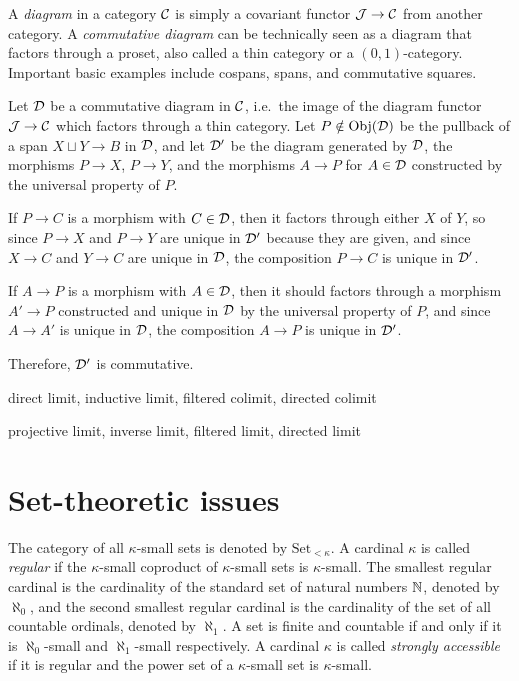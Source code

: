 \documentclass{../../large}
\begin{document}
\begin{prb}
A \emph{diagram} in a category $\mathcal{C}$ is simply a covariant functor $\mathcal{J}\to\mathcal{C}$ from another category.
A \emph{commutative diagram} can be technically seen as a diagram that factors through a proset, also called a thin category or a $(0,1)$-category.
Important basic examples include cospans, spans, and commutative squares.


Let $\mathcal{D}$ be a commutative diagram in $\mathcal{C}$, i.e.~the image of the diagram functor $\mathcal{J}\to\mathcal{C}$ which factors through a thin category.
Let $P\notin\operatorname{Obj}(\mathcal{D})$ be the pullback of a span $X\sqcup Y\to B$ in $\mathcal{D}$, and let $\mathcal{D}'$ be the diagram generated by $\mathcal{D}$, the morphisms $P\to X$, $P\to Y$, and the morphisms $A\to P$ for $A\in\mathcal{D}$ constructed by the universal property of $P$.

If $P\to C$ is a morphism with $C\in\mathcal{D}$, then it factors through either $X$ of $Y$, so since $P\to X$ and $P\to Y$ are unique in $\mathcal{D}'$ because they are given, and since $X\to C$ and $Y\to C$ are unique in $\mathcal{D}$, the composition $P\to C$ is unique in $\mathcal{D}'$.

If $A\to P$ is a morphism with $A\in\mathcal{D}$, then it should factors through a morphism $A'\to P$ constructed and unique in $\mathcal{D}$ by the universal property of $P$, and since $A\to A'$ is unique in $\mathcal{D}$, the composition $A\to P$ is unique in $\mathcal{D}'$.

Therefore, $\mathcal{D}'$ is commutative.




\end{prb}


direct limit, inductive limit, filtered colimit, directed colimit

projective limit, inverse limit, filtered limit, directed limit

\section{Set-theoretic issues}



The category of all $\kappa$-small sets is denoted by $\mathrm{Set}_{<\kappa}$.
A cardinal $\kappa$ is called \emph{regular} if the $\kappa$-small coproduct of $\kappa$-small sets is $\kappa$-small.
The smallest regular cardinal is the cardinality of the standard set of natural numbers $\mathbb{N}$, denoted by $\aleph_0$, and the second smallest regular cardinal is the cardinality of the set of all countable ordinals, denoted by $\aleph_1$.
A set is finite and countable if and only if it is $\aleph_0$-small and $\aleph_1$-small respectively.
A cardinal $\kappa$ is called \emph{strongly accessible} if it is regular and the power set of a $\kappa$-small set is $\kappa$-small.
\end{document}
